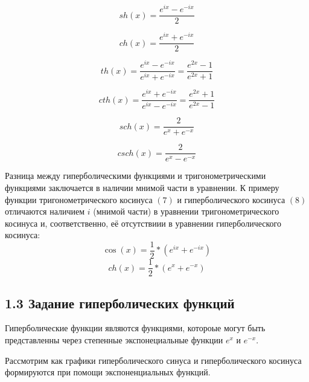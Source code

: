 \begin{equation}
    sh(x)=\frac{e^{ix}-e^{-ix}}{2}
 \end{equation}
 
 \begin{equation}
    ch(x)=\frac{e^{ix}+e^{-ix}}{2}
 \end{equation}
 
 \begin{equation}
    th(x)=\frac{e^{ix}-e^{-ix}}{e^{ix}+e^{-ix}}=\frac{e^{2x}-1}{e^{2x}+1}
 \end{equation}
 
 \begin{equation}
    cth(x)=\frac{e^{ix}+e^{-ix}}{e^{ix}-e^{-ix}}=\frac{e^{2x}+1}{e^{2x}-1}
 \end{equation}
 
 \begin{equation}
    sch(x)=\frac{2}{e^{x}+e^{-x}}
 \end{equation}
 
 \begin{equation}
    csch(x)=\frac{2}{e^{x}-e^{-x}}
 \end{equation}
 
Разница между гиперболическими функциями и тригонометрическими функциями заключается в наличии мнимой части в уравнении. 
К примеру функции тригонометрического косинуса $(7)$ и гиперболического косинуса $(8)$ отличаются наличием $i$ (мнимой части) в уравнении тригонометрического косинуса и, соответственно, её отсутствиии в уравнении гиперболического косинуса:\\
 \begin{equation}
    \cos(x)=\frac{1}{2}*(e^{ix}+e^{-ix})
 \end{equation}
 \begin{equation}
    ch(x)=\frac{1}{2}*(e^{x}+e^{-x})
\end{equation}

\subsection*{1.3 Задание гиперболических функций}

Гиперболические функции являются функциями, котороые могут быть представленны через степенные экспонециальные функции $e^x$ и $e^{-x}$. 

Рассмотрим как графики гиперболического синуса и гиперболического косинуса формируются при помощи экспоненциальных функций. 

